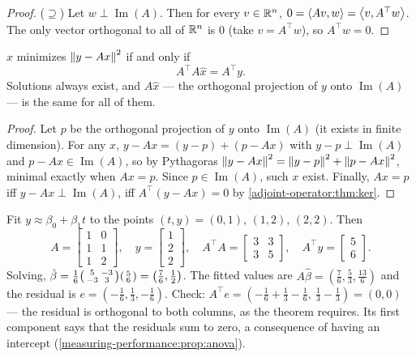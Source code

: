 \begin{notechapter}
\begin{proof}
($\supseteq$) Let $w\perp\operatorname{Im}(A)$. Then for every $v\in\mathbb{R}^n$,
$0 = \left\langle Av, w \right\rangle = \left\langle v, A^\top w \right\rangle$. The only vector orthogonal to all of
$\mathbb{R}^n$ is $0$ (take $v = A^\top w$), so $A^\top w = 0$.
\end{proof}

\begin{theorem}\label{adjoint-operator:thm:normal}
$\hat x$ minimizes $\left\|y - Ax\right\|^2$ if and only if
\[
  A^\top A\hat x = A^\top y .
\]
Solutions always exist, and $A\hat x$ --- the orthogonal projection of $y$ onto
$\operatorname{Im}(A)$ --- is the same for all of them.
\end{theorem}

\begin{proof}
Let $p$ be the orthogonal projection of $y$ onto $\operatorname{Im}(A)$ (it exists in
finite dimension). For any $x$, $y - Ax = (y - p) + (p - Ax)$ with $y - p\perp\operatorname{Im}(A)$
and $p - Ax\in\operatorname{Im}(A)$, so by Pythagoras
$\left\|y - Ax\right\|^2 = \left\|y-p\right\|^2 + \left\|p - Ax\right\|^2$, minimal exactly when $Ax = p$.
Since $p\in\operatorname{Im}(A)$, such $x$ exist. Finally, $Ax = p$ iff $y - Ax\perp\operatorname{Im}(A)$,
iff $A^\top(y - Ax) = 0$ by \cref{adjoint-operator:thm:ker}.
\end{proof}

\begin{example}\label{adjoint-operator:ex:line}
Fit $y\approx\beta_0 + \beta_1t$ to the points $(t,y) = (0,1)$, $(1,2)$, $(2,2)$. Then
\[
  A = \begin{bmatrix}1&0\\1&1\\1&2\end{bmatrix},\quad
  y = \begin{bmatrix}1\\2\\2\end{bmatrix},\quad
  A^\top A = \begin{bmatrix}3&3\\3&5\end{bmatrix},\quad
  A^\top y = \begin{bmatrix}5\\6\end{bmatrix}.
\]
Solving, $\hat\beta = \frac16\begin{psmallmatrix}5&-3\\-3&3\end{psmallmatrix}\begin{psmallmatrix}5\\6\end{psmallmatrix} = \bigl(\frac76,\frac12\bigr)$.
The fitted values are $A\hat\beta = (\frac76,\frac53,\frac{13}6)$ and the residual is
$e = (-\frac16,\frac13,-\frac16)$. Check: $A^\top e = (-\frac16+\frac13-\frac16,\ \frac13-\frac13) = (0,0)$ ---
the residual is orthogonal to both columns, as the theorem requires. Its first
component says that the residuals sum to zero, a consequence of having an intercept
(\cref{measuring-performance:prop:anova}).
\end{example}


\end{notechapter}
